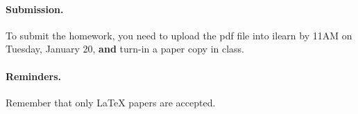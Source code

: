 
\vskip 0.1in
\paragraph{Submission.}
To submit the homework, you need to upload the pdf file into ilearn by 11AM on Tuesday, January 20,
\textbf{and} turn-in a paper copy in class.

\paragraph{Reminders.}
Remember that only {\LaTeX} papers are accepted. 


